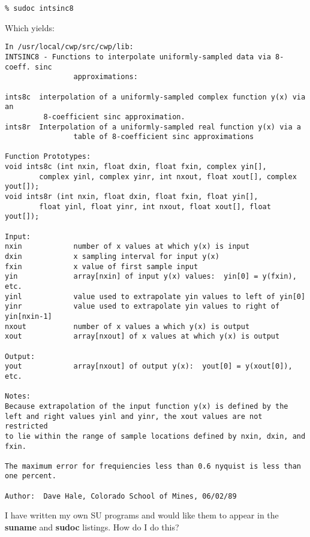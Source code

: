 {{{{{{{\begin{rmans}
{\small \begin{verbatim}
% sudoc intsinc8
\end{verbatim}} \noindent

Which yields:

\begin{verbatim}
In /usr/local/cwp/src/cwp/lib: 
INTSINC8 - Functions to interpolate uniformly-sampled data via 8-coeff. sinc
                approximations:

ints8c  interpolation of a uniformly-sampled complex function y(x) via an
         8-coefficient sinc approximation.
ints8r  Interpolation of a uniformly-sampled real function y(x) via a
                table of 8-coefficient sinc approximations

Function Prototypes:
void ints8c (int nxin, float dxin, float fxin, complex yin[], 
        complex yinl, complex yinr, int nxout, float xout[], complex yout[]);
void ints8r (int nxin, float dxin, float fxin, float yin[], 
        float yinl, float yinr, int nxout, float xout[], float yout[]);

Input:
nxin            number of x values at which y(x) is input
dxin            x sampling interval for input y(x)
fxin            x value of first sample input
yin             array[nxin] of input y(x) values:  yin[0] = y(fxin), etc.
yinl            value used to extrapolate yin values to left of yin[0]
yinr            value used to extrapolate yin values to right of yin[nxin-1]
nxout           number of x values a which y(x) is output
xout            array[nxout] of x values at which y(x) is output

Output:
yout            array[nxout] of output y(x):  yout[0] = y(xout[0]), etc.

Notes:
Because extrapolation of the input function y(x) is defined by the
left and right values yinl and yinr, the xout values are not restricted
to lie within the range of sample locations defined by nxin, dxin, and
fxin.

The maximum error for frequiencies less than 0.6 nyquist is less than
one percent.

Author:  Dave Hale, Colorado School of Mines, 06/02/89

\end{verbatim}
\end{rmans}

\begin{question}
I have written my own SU programs and would like them to appear 
in the {\bf suname\/} and {\bf sudoc\/} listings. How do I do this?
\end{question}

}}}}}}}
